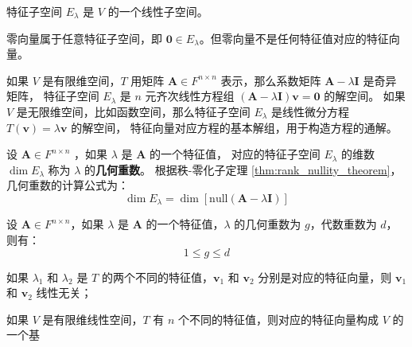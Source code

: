 \begin{proposition}
    特征子空间 $E_\lambda$ 是 $V$ 的一个线性子空间。
\end{proposition}

\begin{corollary}
    零向量属于任意特征子空间，即 $\mathbf{0}\in E_\lambda$。但零向量不是任何特征值对应的特征向量。
\end{corollary}

\begin{note}
    如果 $V$ 是有限维空间，$T$ 用矩阵 $\mathbf{A}\in F^{n\times n}$ 表示，那么系数矩阵 $\mathbf{A} - \lambda \mathbf{I}$ 是奇异矩阵，
    特征子空间 $E_\lambda$ 是 $n$ 元齐次线性方程组 $(\mathbf{A} - \lambda \mathbf{I})\mathbf{v} = \mathbf{0}$ 的解空间。
    如果 $V$ 是无限维空间，比如函数空间，那么特征子空间 $E_\lambda$ 是线性微分方程 $T(\mathbf{v}) = \lambda \mathbf{v}$ 的解空间，
    特征向量对应方程的基本解组，用于构造方程的通解。
\end{note}
\vspace{1em}

\begin{definition}
    设 $\mathbf{A}\in F^{n\times n}$ ，如果 $\lambda$ 是 $\mathbf{A}$ 的一个特征值，
    对应的特征子空间 $E_\lambda$ 的维数 $\dim E_\lambda$ 称为 $\lambda$ 的\textbf{几何重数}。
    根据秩-零化子定理 \ref{thm:rank_nullity_theorem}，几何重数的计算公式为：
    \[
        \dim E_\lambda = \dim[\mathrm{null}(\mathbf{A} - \lambda \mathbf{I})]
    \]
    \label{def:geometric_multiplicity_of_eigenvalue}
\end{definition}

\begin{proposition}[几何重数与代数重数的关系]
    设 $\mathbf{A}\in F^{n\times n}$，如果 $\lambda$ 是 $\mathbf{A}$ 的一个特征值，$\lambda$ 的几何重数为 $g$，代数重数为 $d$，则有：
    \[
        1 \leq g \leq d
    \]
\end{proposition}
\vspace{1em}

\begin{proposition}[不同特征值对应的特征向量线性无关]
    如果 $\lambda_1$ 和 $\lambda_2$ 是 $T$ 的两个不同的特征值，$\mathbf{v}_1$ 和 $\mathbf{v}_2$ 分别是对应的特征向量，则 $\mathbf{v}_1$ 和 $\mathbf{v}_2$ 线性无关；
\end{proposition}

\begin{corollary}[不同特征值的特征向量构成线性无关组]
    如果 $V$ 是有限维线性空间，$T$ 有 $n$ 个不同的特征值，则对应的特征向量构成 $V$ 的一个基
\end{corollary}


